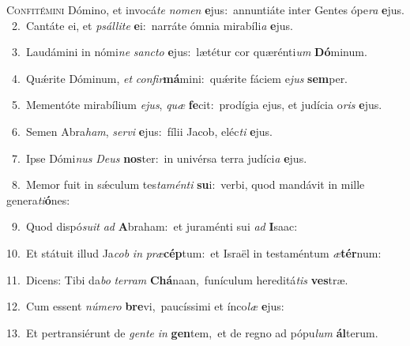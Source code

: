 \lettrine{\initial\textcolor{\initialcolor}{C}}{onfitémini} Dómino, et invocá\textit{te} \textit{no}\-\textit{men} \textbf{e}\-jus:~\star annuntiáte inter Gentes ópe\textit{ra} \textbf{e}\-jus.\\
{\numbfont\textcolor{\numbcolor}{~2.}}~Cantáte ei, et \textit{psál}\-\textit{li}\textit{te} \textbf{e}\-i:~\star narráte ómnia mirabíli\textit{a} \textbf{e}\-jus.\par
{\numbfont\textcolor{\numbcolor}{~3.}}~Laudámini in nómi\textit{ne} \textit{sanc}\-\textit{to} \textbf{e}\-jus:~\star lætétur cor quærénti\textit{um} \textbf{Dó}\-minum.\par
{\numbfont\textcolor{\numbcolor}{~4.}}~Quǽrite Dóminum, \textit{et} \textit{con}\-\textit{fir}\textbf{má}mini:~\star quǽrite fáciem e\textit{jus} \textbf{sem}\-per.\par
{\numbfont\textcolor{\numbcolor}{~5.}}~Mementóte mirabílium \textit{e}\-\textit{jus}, \textit{quæ} \textbf{fe}\-cit:~\star prodígia ejus, et judícia o\textit{ris} \textbf{e}\-jus.\par
{\numbfont\textcolor{\numbcolor}{~6.}}~Semen Abra\-\textit{ham}\-, \textit{ser}\-\textit{vi} \textbf{e}\-jus:~\star fílii Jacob, eléc\textit{ti} \textbf{e}\-jus.\par
{\numbfont\textcolor{\numbcolor}{~7.}}~Ipse Dómi\textit{nus} \textit{De}\-\textit{us} \textbf{nos}\-ter:~\star in univérsa terra judíci\textit{a} \textbf{e}\-jus.\par
{\numbfont\textcolor{\numbcolor}{~8.}}~Memor fuit in sǽculum tes\-\textit{ta}\-\textit{mén}\textit{ti} \textbf{su}\-i:~\star verbi, quod mandávit in mille genera\-\textit{ti}\-\textbf{ó}nes:\par
{\numbfont\textcolor{\numbcolor}{~9.}}~Quod dispó\-\textit{su}\-\textit{it} \textit{ad} \textbf{A}\-braham:~\star et juraménti sui \textit{ad} \textbf{I}\-saac:\par
{\numbfont\textcolor{\numbcolor}{10.}}~Et státuit illud Ja\textit{cob} \textit{in} \textit{præ}\-\textbf{cép}tum:~\star et Israël in testaméntum \textit{æ}\-\textbf{tér}num:\par
{\numbfont\textcolor{\numbcolor}{11.}}~Dicens: Tibi da\textit{bo} \textit{ter}\-\textit{ram} \textbf{Chá}\-naan,~\star funículum hereditá\textit{tis} \textbf{ves}\-træ.\par
{\numbfont\textcolor{\numbcolor}{12.}}~Cum essent \textit{nú}\-\textit{me}\textit{ro} \textbf{bre}\-vi,~\star paucíssimi et ínco\textit{læ} \textbf{e}\-jus:\par
{\numbfont\textcolor{\numbcolor}{13.}}~Et pertransiérunt de \textit{gen}\-\textit{te} \textit{in} \textbf{gen}\-tem,~\star et de regno ad pópu\textit{lum} \textbf{ál}\-terum.\par
